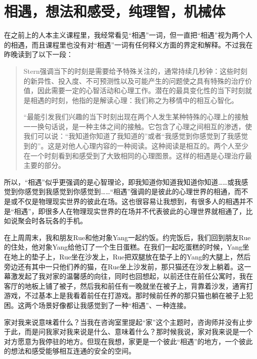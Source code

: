 \chapter{相遇，想法和感受，纯理智，机械体}






在之前上的人本主义课程里，我经常看见“相遇”一词，但一直把“相遇”视为两个人的相遇，而且课程里也没有对“相遇”一词有任何释义方面的界定和解释。不过我在昨晚读到了以下一段：

\blockquote{
Stern强调当下的时刻是需要给予特殊关注的，通常持续几秒钟：这些时刻的新异性、投入度、不可预测性以及可能产生的问题使之具有特殊的治疗价值，因此需要一定的心智活动和心理工作。潜在的最具变化性的当下时刻就是相遇的时刻，他指的是解读心理：我们称之为移情中的相互心智化。

“最能引发我们兴趣的当下时刻出现在两个人发生某种特殊的心理上的接触一一换句话说，是一种主体之间的接触。它包含了心理之间相互的渗透，使我们可以说：“我知道你知道了我知道的”或者“我感觉到你感觉到了我感觉到的”。这是对他人心理内容的一种阅读。这种阅读是相互的。两个人至少在一个时刻看到和感受到了大致相同的心理图景。这样的相遇是心理治疗最主要的部分。

}

所以，“相遇”似乎更强调的是心智理论，即我知道你知道我知道你知道……或我感觉到你感觉到我感觉到你感觉到……“相遇”强调的是彼此的心理世界的相通，而不是或不仅是物理现实世界的彼此在场。这也很容易让我想到，有很多人的相遇并不是“相遇”，即很多人在物理现实世界的在场并不代表彼此的心理世界就相通了，比如说聚会时各玩各的手机。

在上周周末，我和朋友Rue和他对象Yang一起约饭。约完饭后，我们回到朋友Rue的住处，他对象Yang给他订了一个生日蛋糕。在我们一起吃蛋糕的时候，Yang坐在地上的垫子上，Rue坐在沙发上，Rue把双腿放在垫子上的Yang的大腿上，然后旁边还有其中一只他们养的猫，在Rue坐上沙发前，那只猫还在沙发上躺着。这一幕激发起了我对家的温馨感的向往，同时也回想起，以前还住在前任公寓时，我在客厅的地板上铺了被子，然后我和前任有一晚就坐在被子上，背靠着沙发，通宵打游戏，不过基本上是我看着前任在打游戏。那时候前任养的那只猫也躺在被子上犯困。这两个场景好像都让我感觉到了一种“相遇”、一种连接。

家对我来说意味着什么？当我在咨询室里提起“家”这个主题时，咨询师并没有止步于此，而是问我家对我来说是什么、意味着什么？那时候我说，家对我来说是一个对方愿意为我停驻的地方。但现在我想，家更是一个彼此“相遇”的地方，一个彼此的想法和感受能够相互连通的安全的空间。

